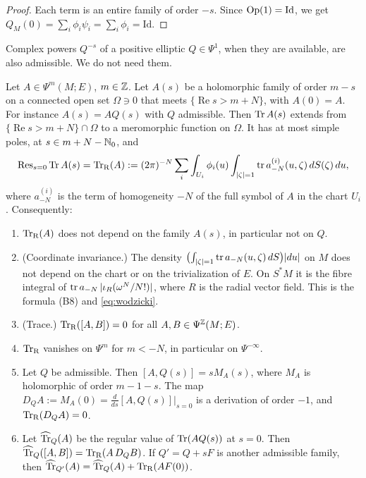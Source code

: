 \begin{proof}
Each term is an entire family of order \(-s\). Since \(\operatorname{Op}(1)=
\mathrm{Id}\), we get \(Q_M(0)=\sum_i\phi_i\psi_i=\sum_i\phi_i=\mathrm{Id}\).
\end{proof}

Complex powers \(Q^{-s}\) of a positive elliptic \(Q\in\Psi^1\), when they
are available, are also admissible. We do not need them.

\begin{theorem}\label{tr:thm:res}
Let \(A\in\Psi^m(M;E)\), \(m\in\mathbb Z\). Let \(A(s)\) be a holomorphic family of
order \(m-s\) on a connected open set \(\Omega\ni0\) that meets
\(\{\operatorname{Re}s>m+N\}\), with \(A(0)=A\). For instance
\(A(s)=AQ(s)\) with \(Q\) admissible. Then \(\operatorname{Tr} A(s)\) extends from
\(\{\operatorname{Re}s>m+N\}\cap\Omega\) to a meromorphic function on
\(\Omega\). It has at most simple poles, at \(s\in m+N-\mathbb N_0\), and
\begin{equation}\label{tr:eq:res}
 \operatorname{Res}_{s=0}\operatorname{Tr} A(s)=\operatorname{Tr}_{\mathrm R}(A):=(2\pi)^{-N}\sum_i\int_{U_i}\phi_i(u)
 \int_{|\zeta|=1}\operatorname{tr} a^{(i)}_{-N}(u,\zeta)\,dS(\zeta)\,du ,
\end{equation}
where \(a^{(i)}_{-N}\) is the term of homogeneity \(-N\) of the full symbol
of \(A\) in the chart \(U_i\). Consequently:
\begin{enumerate}
\item \(\operatorname{Tr}_{\mathrm R}(A)\) does not depend on the family \(A(s)\), in particular not
on \(Q\).
\item (Coordinate invariance.) The density
\(\bigl(\int_{|\zeta|=1}\operatorname{tr} a_{-N}(u,\zeta)\,dS\bigr)|du|\) on \(M\) does not
depend on the chart or on the trivialization of \(E\). On \(S^*M\) it is
the fibre integral of \(\operatorname{tr} a_{-N}\,|\iota_R(\omega^N/N!)|\), where \(R\)
is the radial vector field. This is the formula (B8) and \eqref{eq:wodzicki}.
\item (Trace.) \(\operatorname{Tr}_{\mathrm R}([A,B])=0\) for all \(A,B\in\Psi^{\mathbb Z}(M;E)\).
\item \(\operatorname{Tr}_{\mathrm R}\) vanishes on \(\Psi^{m}\) for \(m<-N\), in particular on
\(\Psi^{-\infty}\).
\item Let \(Q\) be admissible. Then \([A,Q(s)]=sM_A(s)\), where \(M_A\) is
holomorphic of order \(m-1-s\). The map
\(D_QA:=M_A(0)=\frac{d}{ds}[A,Q(s)]|_{s=0}\) is a derivation of order
\(-1\), and \(\operatorname{Tr}_{\mathrm R}(D_QA)=0\).
\item Let \(\widehat{\operatorname{Tr}}_Q(A)\) be the regular value of \(\operatorname{Tr}(AQ(s))\) at
\(s=0\). Then \(\widehat{\operatorname{Tr}}_Q([A,B])=\operatorname{Tr}_{\mathrm R}(A\,D_QB)\). If \(Q'=Q+sF\) is
another admissible family, then \(\widehat{\operatorname{Tr}}_{Q'}(A)=\widehat{\operatorname{Tr}}_Q(A)+
\operatorname{Tr}_{\mathrm R}(AF(0))\).
\end{enumerate}
\end{theorem}

